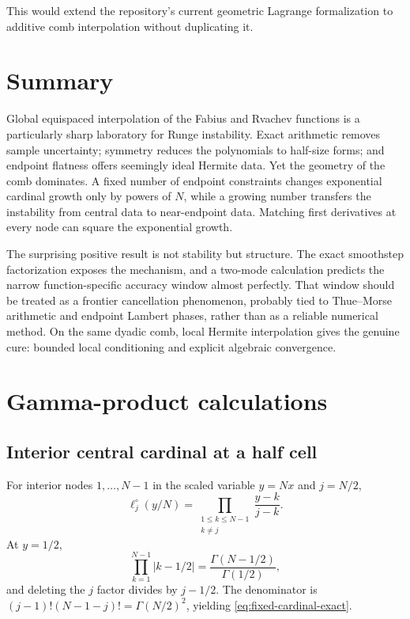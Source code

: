 \documentclass[11pt,oneside]{article}
\theoremstyle{definition}
\theoremstyle{remark}
\begin{document}
This would extend the repository's current geometric Lagrange formalization to additive
comb interpolation without duplicating it.

\section{Summary}

Global equispaced interpolation of the Fabius and Rvachev functions is a particularly sharp
laboratory for Runge instability.  Exact arithmetic removes sample uncertainty; symmetry
reduces the polynomials to half-size forms; and endpoint flatness offers seemingly ideal
Hermite data.  Yet the geometry of the comb dominates.  A fixed number of endpoint
constraints changes exponential cardinal growth only by powers of $N$, while a growing
number transfers the instability from central data to near-endpoint data.  Matching
first derivatives at every node can square the exponential growth.

The surprising positive result is not stability but structure.  The exact smoothstep
factorization exposes the mechanism, and a two-mode calculation predicts the narrow
function-specific accuracy window almost perfectly.  That window should be treated as a
frontier cancellation phenomenon, probably tied to Thue--Morse arithmetic and endpoint
Lambert phases, rather than as a reliable numerical method.  On the same dyadic comb,
local Hermite interpolation gives the genuine cure: bounded local conditioning and explicit
algebraic convergence.

\appendix

\section{Gamma-product calculations}
\label{app:gamma}

\subsection{Interior central cardinal at a half cell}

For interior nodes $1,\ldots,N-1$ in the scaled variable $y=Nx$ and $j=N/2$,
\[
 \ell_j^\circ(y/N)=\prod_{\substack{1\le k\le N-1\\k\ne j}}
 \frac{y-k}{j-k}.
\]
At $y=1/2$,
\[
 \prod_{k=1}^{N-1}|k-1/2|=\frac{\Gamma(N-1/2)}{\Gamma(1/2)},
\]
and deleting the $j$ factor divides by $j-1/2$.  The denominator is
$(j-1)!(N-1-j)!=\Gamma(N/2)^2$, yielding
\eqref{eq:fixed-cardinal-exact}.
\end{document}
